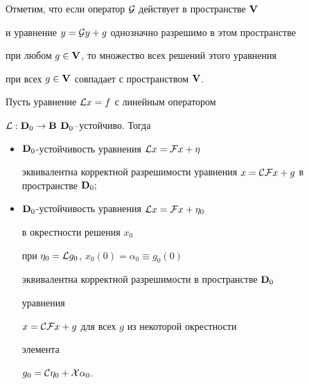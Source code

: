 Отметим, что если оператор $\cal G$ действует в пространстве $\bold {V}$


и уравнение $y={\cal G}y+g$ однозначно разрешимо в этом пространстве


при любом $g\in\bold {V}$, то множество всех решений этого уравнения


при всех $g\in\bold {V}$ совпадает с пространством $\bold {V}$.





\begin{lem}


Пусть уравнение ${\cal L}x=f$ с линейным оператором


${\cal L}:\bold {D}_0\to\bold {B}$\; $\bold {D}_0$--устойчиво. Тогда


\begin{itemize}


\item[а)] $\spc{D}_0$-устойчивость уравнения ${\cal L}x={\cal


F}x+\eta$


эквивалентна корректной разрешимости уравнения $x={\cal C}{\cal


F}x+g$ в пространстве $\spc{D}_0;$


\item[б)] $\spc{D}_0$-устойчивость уравнения ${\cal L}x={\cal


F}x+\eta_0$


в окрестности решения $x_0$


при $\eta_0={\cal L}g_0$, $x_0(0)=\alpha_0\equiv g_0(0)$


эквивалентна корректной разрешимости в пространстве $\bold {D}_0$


уравнения


$x={\cal C}{\cal F}x+g$ для всех $g$ из некоторой окрестности


элемента


$g_0={\cal C}\eta_0+{\cal X}\alpha_0$.


\end{itemize}


\end{lem}






